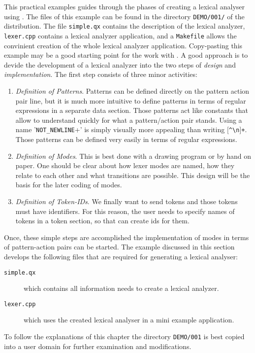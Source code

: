 This practical examples guides through the phases of creating a lexical
analyser using {\quex}. The files of this example can be found in the directory
{\tt DEMO/001/} of the {\quex} distribution. The file {\tt simple.qx} contains
the description of the lexical analyzer, {\tt lexer.cpp} contains a lexical
analyzer application, and a {\tt Makefile} allows the convinient creation of
the whole lexical analyzer application. Copy-pasting this example may be a good
starting point for the work with {\quex}. A good approach is to devide the development
of a lexical analyzer into the two steps of {\it design} and {\it implementation}. 
The first step consists of three minor activities:


\begin{enumerate}
\item {\it Definition of Patterns}. Patterns can be defined directly on the
  pattern action pair line, but it is much more intuitive to define patterns
  in terms of regular expressions \cite{} in a separate data section. Those
  patterns act like constants that allow to understand quickly for what a
  pattern/action pair stands. Using a name '{\tt NOT\_NEWLINE}+' is simply
  visually more appealing than writing {\tt $[$\verb|^\|n$]$+}. Those patterns
  can be defined very easily in terms of regular expressions.
  
\item {\it Definition of Modes}. This is best done with a drawing program or
  by hand on paper. One should be clear about how lexer modes are named, how
  they relate to each other and what transitions are possible. This design
  will be the basis for the later coding of modes.
  
\item {\it Definition of Token-IDs}. We finally want to send tokens and those
  tokens must have identifiers. For this reason, the user needs to specify
  names of tokens in a token section, so that {\quex} can create ids for them.
  
\end{enumerate}

Once, these simple steps are accomplished the implementation of modes in terms
of pattern-action pairs can be started.  The example discussed in this section
develops the following files that are required for generating a lexical
analyser:

\begin{description}
  \item[\tt simple.qx] which contains all information {\quex} needs to create
                       a lexical analyzer. 
  \item[\tt lexer.cpp] which uses the created lexical analyser in a
                       mini example application.
\end{description}

To follow the explanations of this chapter the directory {\tt DEMO/001}
is best copied into a user domain for further examination and modifications.

